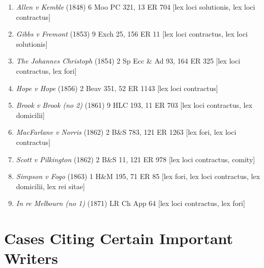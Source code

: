 \documentclass[twoside]{article}
\begin{document}
\begin{enumerate}
\item{\textit{Allen v Kemble} (1848) 6 Moo PC 321, 13 ER 704 [lex loci solutionis, lex loci contractus]}
\item{\textit{Gibbs v Fremont} (1853) 9 Exch 25, 156 ER 11 [lex loci contractus, lex loci solutionis]}
\item{\textit{The Johannes Christoph} (1854) 2 Sp Ecc \& Ad 93, 164 ER 325 [lex loci contractus, lex fori]}
\item{\textit{Hope v Hope} (1856) 2 Beav 351, 52 ER 1143 [lex loci contractus]}
\item{\textit{Brook v Brook (no 2)} (1861) 9 HLC 193, 11 ER 703 [lex loci contractus, lex domicilii]}
\item{\textit{MacFarlane v Norris} (1862) 2 B\&S 783, 121 ER 1263 [lex fori, lex loci contractus]}
\item{\textit{Scott v Pilkington} (1862) 2 B\&S 11, 121 ER 978 [lex loci contractus, comity]}
\item{\textit{Simpson v Fogo} (1863) 1 H\&M 195, 71 ER 85 [lex fori, lex loci contractus, lex domicilii, lex rei sitae]}
\item{\textit{In re Melbourn (no 1)} (1871) LR Ch App 64 [lex loci contractus, lex fori]}
\end{enumerate}
\section{Cases Citing Certain Important Writers}
\end{document}
